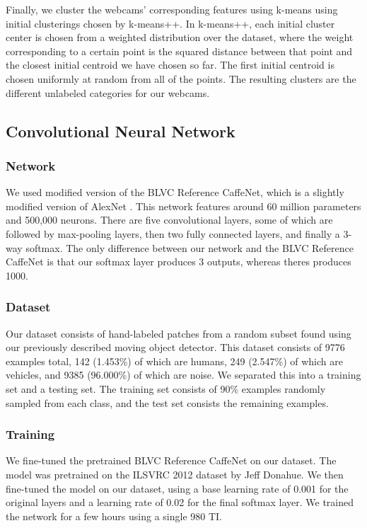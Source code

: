 \documentclass[10pt]{article} %
\begin{document}
Finally, we cluster the webcams' corresponding features using k-means using
initial clusterings chosen by k-means++. In k-means++, each initial cluster
center is chosen from a weighted distribution over the dataset, where the
weight corresponding to a certain point is the squared distance between that
point and the closest initial centroid we have chosen so far. The first initial
centroid is chosen uniformly at random from all of the points. The resulting
clusters are the different unlabeled categories for our webcams.

\subsection{Convolutional Neural Network}
\subsubsection{Network}
We used modified version of the BLVC Reference CaffeNet, which is a slightly
modified version of AlexNet \cite{krizhevsky}. This network features around 60
million parameters and 500,000 neurons. There are five convolutional layers,
some of which are followed by max-pooling layers, then two fully connected
layers, and finally a 3-way softmax.  The only difference between our network
and the BLVC Reference CaffeNet is that our softmax layer produces 3 outputs,
whereas theres produces 1000.
\subsubsection{Dataset}
Our dataset consists of hand-labeled patches from a random subset found using
our previously described moving object detector. This dataset consists of 9776
examples total, 142 (1.453\%) of which are humans, 249 (2.547\%) of which are
vehicles, and 9385 (96.000\%) of which are noise. We separated this into a
training set and a testing set. The training set consists of 90\% examples
randomly sampled from each class, and the test set consists the remaining
examples.
\subsubsection{Training}
We fine-tuned the pretrained BLVC Reference CaffeNet on our dataset. The model
was pretrained on the ILSVRC 2012 dataset by Jeff Donahue. We then fine-tuned
the model on our dataset, using a base learning rate of 0.001 for the original
layers and a learning rate of 0.02 for the final softmax layer. We
trained the network for a few hours using a single 980 TI.
\end{document}
